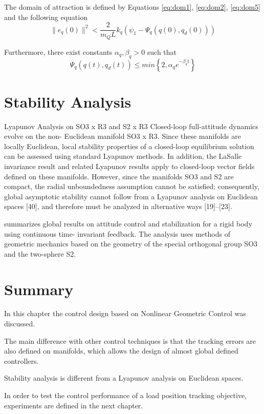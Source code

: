 The domain of attraction is defined by Equations \ref{eq:dom1}, \ref{eq:dom2}, \ref{eq:dom5} and the following equation
\begin{equation}
\parallel e_{\dot{q}}(0)\parallel^2<\frac{2}{m_QL}{k_q}(\psi_1-\Psi_q(q(0),q_d(0)))
\end{equation}


Furthermore, there exist constants $ \alpha_q,\beta_q>0 $ such that
\begin{equation}\label{key}
\Psi_q(q(t),q_d(t)) \leq min\left\lbrace 2,\alpha_qe^{-\beta_qt}\right\rbrace 
\end{equation}

\section{Stability Analysis}\label{sec:con.sta}
Lyapunov Analysis on SO3 x R3 and S2 x R3
Closed-loop full-attitude dynamics evolve on the non- Euclidean manifold SO3 x R3. 
Since these manifolds are locally Euclidean, local stability properties of a closed-loop equilibrium solution can be assessed using standard Lyapunov methods. 
In addition, the LaSalle invariance result and related Lyapunov results apply to closed-loop vector fields defined on these manifolds. 
However, since the manifolds SO3 and S2 are compact, the radial unboundedness assumption cannot be satisfied; 
consequently, global asymptotic stability cannot follow from a Lyapunov analysis on Euclidean spaces [40], and therefore must be analyzed in alternative ways [19]–[23].\cite[p.43]{Chaturvedi2011}

\cite{Chaturvedi2011} summarizes global results on attitude control and stabilization for a rigid body using continuous time- invariant feedback. The analysis uses methods of geometric mechanics based on the geometry of the special orthogonal group SO3 and the two-sphere S2.



\section*{Summary}

In this chapter the control design based on Nonlinear Geometric Control was discussed.

The main difference with other control techniques is that the tracking errors are also defined on manifolds, which allows the design of almost global defined controllers.

Stability analysis is different from a Lyapunov analysis on Euclidean spaces.


In order to test the control performance of a load position tracking objective, experiments are defined in the next chapter. 




